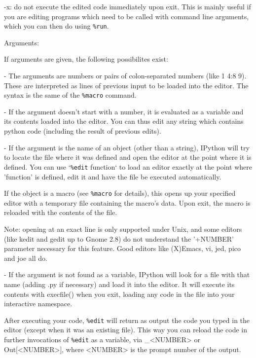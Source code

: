         -x: do not execute the edited code immediately upon exit. This is
        mainly useful if you are editing programs which need to be called with
        command line arguments, which you can then do using \texttt{\%run}.


        Arguments:

        If arguments are given, the following possibilites exist:

        - The arguments are numbers or pairs of colon-separated numbers (like
        1 4:8 9). These are interpreted as lines of previous input to be
        loaded into the editor. The syntax is the same of the \texttt{\%macro} command.

        - If the argument doesn't start with a number, it is evaluated as a
        variable and its contents loaded into the editor. You can thus edit
        any string which contains python code (including the result of
        previous edits).

        - If the argument is the name of an object (other than a string),
        IPython will try to locate the file where it was defined and open the
        editor at the point where it is defined. You can use `\texttt{\%edit} function`
        to load an editor exactly at the point where 'function' is defined,
        edit it and have the file be executed automatically.

        If the object is a macro (see \texttt{\%macro} for details), this opens up your
        specified editor with a temporary file containing the macro's data.
        Upon exit, the macro is reloaded with the contents of the file.

        Note: opening at an exact line is only supported under Unix, and some
        editors (like kedit and gedit up to Gnome 2.8) do not understand the
        '+NUMBER' parameter necessary for this feature. Good editors like
        (X)Emacs, vi, jed, pico and joe all do.

        - If the argument is not found as a variable, IPython will look for a
        file with that name (adding .py if necessary) and load it into the
        editor. It will execute its contents with execfile() when you exit,
        loading any code in the file into your interactive namespace.

        After executing your code, \texttt{\%edit} will return as output the code you
        typed in the editor (except when it was an existing file). This way
        you can reload the code in further invocations of \texttt{\%edit} as a variable,
        via \_<NUMBER> or Out[<NUMBER>], where <NUMBER> is the prompt number of
        the output.


